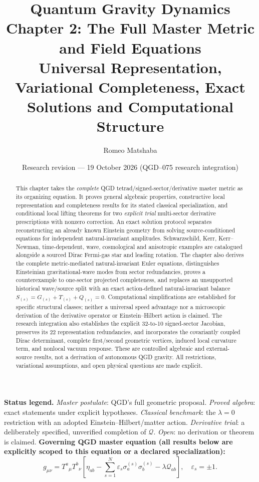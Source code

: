 \documentclass[11pt,a4paper]{article}
\title{\vspace{-9mm}\textbf{Quantum Gravity Dynamics}\\[4pt]
\large Chapter 2: The Full Master Metric and Field Equations\\[6pt]
\normalsize Universal Representation, Variational Completeness, Exact Solutions and Computational Structure}
\author{Romeo Matshaba}
\date{Research revision --- 19 October 2026 (QGD--075 research integration)}
\begin{document}
\maketitle
\begin{abstract}
This chapter takes the \emph{complete} QGD tetrad/signed-sector/derivative master metric as its organizing equation. It proves general algebraic properties, constructive local representation and completeness results for its stated classical specialization, and conditional local lifting theorems for two \emph{explicit trial} multi-sector derivative prescriptions with nonzero correction. An exact solution protocol separates reconstructing an already known Einstein geometry from solving source-conditioned equations for independent natural-invariant amplitudes. Schwarzschild, Kerr, Kerr--Newman, time-dependent, wave, cosmological and anisotropic examples are catalogued alongside a sourced Dirac Fermi-gas star and leading rotation. The chapter also derives the complete metric-mediated natural-invariant Euler equations, distinguishes Einsteinian gravitational-wave modes from sector redundancies, proves a counterexample to one-sector projected completeness, and replaces an unsupported historical wave/source split with an exact action-defined natural-invariant balance $S_{(s)}=G_{(s)}+T_{(s)}+Q_{(s)}=0$. Computational simplifications are established for specific structural classes; neither a universal speed advantage nor a microscopic derivation of the derivative operator or Einstein--Hilbert action is claimed. The research integration also establishes the explicit 32-to-10 signed-sector Jacobian, preserves its 22 representation redundancies, and incorporates the covariantly coupled Dirac determinant, complete first/second geometric vertices, induced local curvature term, and nonlocal vacuum response. These are controlled algebraic and external-source results, not a derivation of autonomous QGD gravity. All restrictions, variational assumptions, and open physical questions are made explicit.
\end{abstract}
\noindent\textbf{Status legend.} \emph{Master postulate}: QGD's full geometric proposal. \emph{Proved algebra}: exact statements under explicit hypotheses. \emph{Classical benchmark}: the \(\lambda=0\) restriction with an adopted Einstein--Hilbert/matter action. \emph{Derivative trial}: a deliberately specified, unverified completion of \(\mathcal Q\). \emph{Open}: no derivation or theorem is claimed.
\medskip
\noindent\textbf{Governing QGD master equation (all results below are explicitly scoped to this equation or a declared specialization):}
\[
\boxed{g_{\mu\nu}=T^a{}_{\mu}T^b{}_{\nu}
\left[\eta_{ab}-\sum_{s=1}^{N}\varepsilon_s\sigma_a^{(s)}\sigma_b^{(s)}
-\lambda\mathcal Q_{ab}\right],\quad \varepsilon_s=\pm1.}
\]
\end{document}
